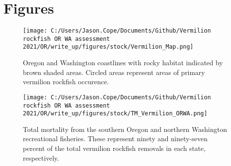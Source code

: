\documentclass[11pt,
  english,
  a4paper,
]{article}
\begin{document}




\newpage







\newpage



\newpage



\newpage



\clearpage

\clearpage


\hypertarget{figures}{%
\section{Figures}\label{figures}}

\leavevmode\tagmcend\tagstructend


\begin{figure}
\centering
\texttt{[image: C:/Users/Jason.Cope/Documents/Github/Vermilion rockfish OR WA assessment 2021/OR/write\_up/figures/stock/Vermilion\_Map.png]}
\caption{Oregon and Washington coastlines with rocky habitat indicated by brown shaded areas. Circled areas represent areas of primary vermilion rockfish occurence.\label{fig:ORWA-map}}
\end{figure}

\tagmcend\tagstructend


\begin{figure}
\centering
\texttt{[image: C:/Users/Jason.Cope/Documents/Github/Vermilion rockfish OR WA assessment 2021/OR/write\_up/figures/stock/TM\_Vermilion\_ORWA.png]}
\caption{Total mortality from the southern Oregon and northern Washington recreational fisheries. These represent ninety and ninety-seven percent of the total vermilion rockfish removals in each state, respectively.\label{fig:tm-plot}}
\end{figure}
\end{document}
